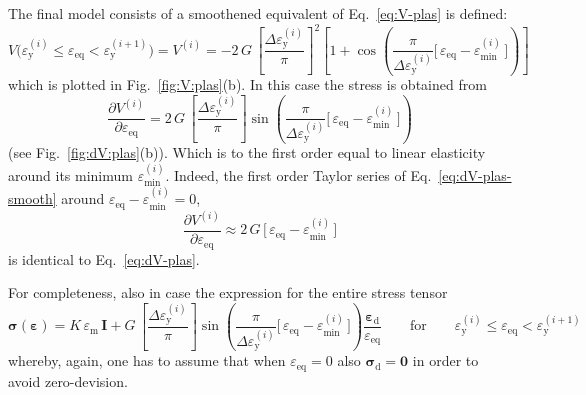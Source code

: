 \documentclass[times,namecite]{goose-article}
\begin{document}
The final model consists of a smoothened equivalent of Eq.~\eqref{eq:V-plas} is defined:
\begin{equation}\label{eq:V-plas-smooth}
  V \big(
    \varepsilon_\mathrm{y}^{(i)} \leq \varepsilon_\mathrm{eq} < \varepsilon_\mathrm{y}^{(i+1)}
  \big)
  =
  V^{(i)}
  =
  - 2 \, G \,
  \left[ \frac{\Delta \varepsilon_\mathrm{y}^{(i)}}{\pi} \right]^2
  \left[
    1
    +
    \cos \left(
      \frac{ \pi }{ \Delta \varepsilon_\mathrm{y}^{(i)} }
      \Big[\, \varepsilon_\mathrm{eq} - \varepsilon_\mathrm{min}^{(i)} \,\Big]
    \right)
  \right]
\end{equation}
which is plotted in Fig.~\ref{fig:V:plas}(b). In this case the stress is obtained from
\begin{equation}\label{eq:dV-plas-smooth}
  \frac{\partial V^{(i)}}{\partial \varepsilon_\mathrm{eq}}
  =
  2 \, G \,
  \left[ \frac{\Delta \varepsilon_\mathrm{y}^{(i)}}{\pi} \right]
  \sin \left(
    \frac{ \pi }{ \Delta \varepsilon_\mathrm{y}^{(i)} }
    \Big[\, \varepsilon_\mathrm{eq} - \varepsilon_\mathrm{min}^{(i)} \,\Big]
  \right)
\end{equation}
(see Fig.~\ref{fig:dV:plas}(b)). Which is to the first order equal to linear elasticity around its minimum $\varepsilon_\mathrm{min}^{(i)}$. Indeed, the first order Taylor series of Eq.~\eqref{eq:dV-plas-smooth} around $\varepsilon_\mathrm{eq} - \varepsilon_\mathrm{min}^{(i)} = 0$,
\begin{equation}
  \frac{\partial V^{(i)}}{\partial \varepsilon_\mathrm{eq}}
  \approx
  2 \, G \, \Big[\, \varepsilon_\mathrm{eq} - \varepsilon_\mathrm{min}^{(i)} \,\Big]
\end{equation}
is identical to Eq.~\eqref{eq:dV-plas}.

For completeness, also in case the expression for the entire stress tensor
\begin{equation}
  \bm{\sigma} ( \bm{\varepsilon} )
  =
  K \, \varepsilon_\mathrm{m} \, \bm{I}
  +
  G \,
  \left[ \frac{\Delta \varepsilon_\mathrm{y}^{(i)}}{\pi} \right]
  \sin \left(
    \frac{ \pi }{ \Delta \varepsilon_\mathrm{y}^{(i)} }
    \Big[\, \varepsilon_\mathrm{eq} - \varepsilon_\mathrm{min}^{(i)} \,\Big]
  \right)
  \frac{\bm{\varepsilon}_\mathrm{d}}{\varepsilon_\mathrm{eq}}
  \qquad
  \mathrm{for}
  \qquad
  \varepsilon_\mathrm{y}^{(i)} \leq \varepsilon_\mathrm{eq} < \varepsilon_\mathrm{y}^{(i+1)}
\end{equation}
whereby, again, one has to assume that when $\varepsilon_\mathrm{eq} = 0$ also $\bm{\sigma}_\mathrm{d} = \bm{0}$ in order to avoid zero-devision.
\end{document}
